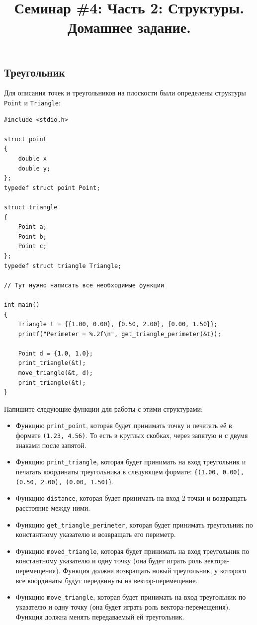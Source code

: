 \documentclass[10pt]{article}
\begin{document}
\title{Семинар \#4: Часть 2: Структуры. Домашнее задание.\vspace{-5ex}}\date{}\maketitle

\subsection{Треугольник}
Для описания точек и треугольников на плоскости были определены структуры \texttt{Point} и \texttt{Triangle}:
\begin{lstlisting}
#include <stdio.h>

struct point 
{
    double x
    double y;
};
typedef struct point Point;

struct triangle 
{
    Point a;
    Point b;
    Point c;
};
typedef struct triangle Triangle;

// Тут нужно написать все необходимые функции

int main()
{
    Triangle t = {{1.00, 0.00}, {0.50, 2.00}, {0.00, 1.50}};
    printf("Perimeter = %.2f\n", get_triangle_perimeter(&t));
    
    Point d = {1.0, 1.0};
    print_triangle(&t);
    move_triangle(&t, d);
    print_triangle(&t);
}

\end{lstlisting}
Напишите следующие функции для работы с этими структурами:
\begin{itemize}
\item Функцию \texttt{print\_point}, которая будет принимать точку и печатать её в формате \texttt{(1.23, 4.56)}. То есть в круглых скобках, через запятую и с двумя знаками после запятой.

\item Функцию \texttt{print\_triangle}, которая будет принимать на вход треугольник и печатать координаты треугольника в следующем формате: \texttt{\{(1.00, 0.00), (0.50, 2.00), (0.00, 1.50)\}}.

\item Функцию \texttt{distance}, которая будет принимать на вход 2 точки и возвращать расстояние между ними.

\item Функцию \texttt{get\_triangle\_perimeter}, которая будет принимать треугольник по константному указателю и возвращать его периметр.

\item Функцию \texttt{moved\_triangle}, которая будет принимать на вход треугольник по константному указателю и одну точку (она будет играть роль вектора-перемещения). Функция должна возвращать новый треугольник, у которого все координаты будут передвинуты на вектор-перемещение.

\item Функцию \texttt{move\_triangle}, которая будет принимать на вход треугольник по указателю и одну точку (она будет играть роль вектора-перемещения). Функция должна менять передаваемый ей треугольник.
\end{itemize}
\end{document}
